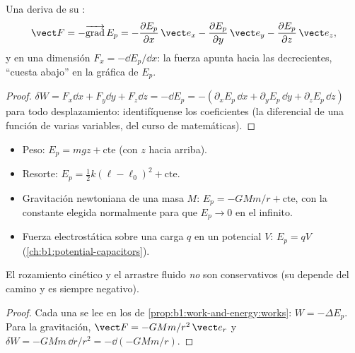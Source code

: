 \begin{proposition}\label{prop:b1:work-and-energy:gradient}
Una  deriva de su :
\[
\vect F = -\overrightarrow{\operatorname{grad}}\,E_p
= -\frac{\partial E_p}{\partial x}\,\vect e_x
- \frac{\partial E_p}{\partial y}\,\vect e_y
- \frac{\partial E_p}{\partial z}\,\vect e_z ,
\]
y en una dimensión $F_x = -\dd E_p/\dd x$: la fuerza apunta hacia las
 decrecientes, ``cuesta abajo'' en la gráfica de $E_p$.
\end{proposition}

\begin{proof}
$\delta W = F_x\dd x + F_y\dd y + F_z\dd z = -\dd E_p = -(\partial_xE_p\,\dd x
+ \partial_yE_p\,\dd y + \partial_zE_p\,\dd z)$ para todo desplazamiento:
identifíquense los coeficientes (la diferencial de una función de varias
variables, del curso de matemáticas).
\end{proof}

\begin{proposition}\label{prop:b1:work-and-energy:eps}
\begin{itemize}
  \item Peso: $E_p = mgz + \text{cte}$ (con $z$ hacia arriba).
  \item Resorte: $E_p = \tfrac12 k(\ell - \ell_0)^2 + \text{cte}$.
  \item Gravitación newtoniana de una masa $M$: $E_p = -GMm/r + \text{cte}$,
        con la constante elegida normalmente para que $E_p \to 0$ en el
        infinito.
  \item Fuerza electrostática sobre una carga $q$ en un potencial $V$:
        $E_p = qV$ (\cref{ch:b1:potential-capacitors}).
\end{itemize}
El rozamiento cinético y el arrastre fluido \emph{no} son conservativos
(su  depende del camino y es siempre negativo).
\end{proposition}

\begin{proof}
Cada una se lee en los  de \cref{prop:b1:work-and-energy:works}:
$W = -\Delta E_p$. Para la gravitación, $\vect F = -GMm/r^2\,\vect e_r$ y
$\delta W = -GMm\,\dd r/r^2 = -\dd(-GMm/r)$.
\end{proof}

